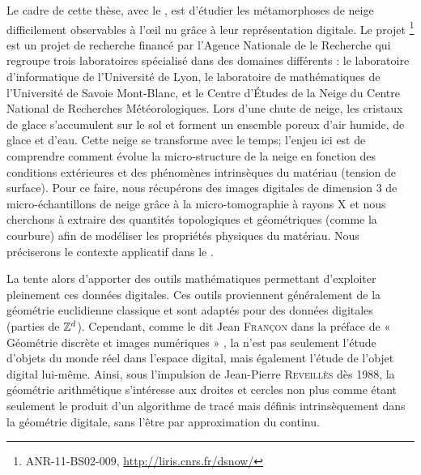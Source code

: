 Le cadre de cette thèse, avec le , est d'étudier
les métamorphoses de neige difficilement observables à l'œil nu grâce à leur
représentation digitale. Le projet \digitalSnow\footnote{ANR-11-BS02-009,
\url{http://liris.cnrs.fr/dsnow/}} est un projet de recherche financé par
l'Agence Nationale de le Recherche qui regroupe trois laboratoires spécialisé
dans des domaines différents : le laboratoire d'informatique
\textsc{} de l'Université de Lyon, le laboratoire de
mathématiques \textsc{} de l'Université de Savoie Mont-Blanc, et
le Centre d'Études de la Neige \textsc{} du Centre National de
Recherches Météorologiques. Lors d'une chute de neige, les cristaux de glace
s'accumulent sur le sol et forment un ensemble poreux d'air humide, de glace et
d'eau. Cette neige se transforme avec le temps; l'enjeu ici est de comprendre
comment évolue la micro-structure de la neige en fonction des conditions
extérieures et des phénomènes intrinsèques du matériau (tension de surface). Pour
ce faire, nous récupérons des images digitales de dimension 3 de
micro-échantillons de neige grâce à la micro-tomographie à rayons X et nous
cherchons à extraire des quantités topologiques et géométriques (comme la
courbure) afin de modéliser les propriétés physiques du matériau. Nous
préciserons le contexte applicatif dans le
.

La  tente alors d'apporter des outils mathématiques
permettant d'exploiter pleinement ces données digitales. Ces outils proviennent
généralement de la géométrie euclidienne classique et sont adaptés pour des
données digitales (parties de $\mathbb{Z}^d$). Cependant, comme le dit Jean
\textsc{Françon} dans la préface de « Géométrie discrète et images numériques »
\cite{Coeurjolly2007Book}, la \DigitalGeometry n'est pas seulement l'étude
d'objets du monde réel dans l'espace digital, mais également l'étude de l'objet
digital lui-même. Ainsi, sous l'impulsion de Jean-Pierre \textsc{Reveillès} dès
1988, la géométrie arithmétique s'intéresse aux droites et cercles non plus
comme étant seulement le produit d’un algorithme de tracé mais définis
intrinsèquement dans la géométrie digitale, sans l’être par approximation du
continu.

